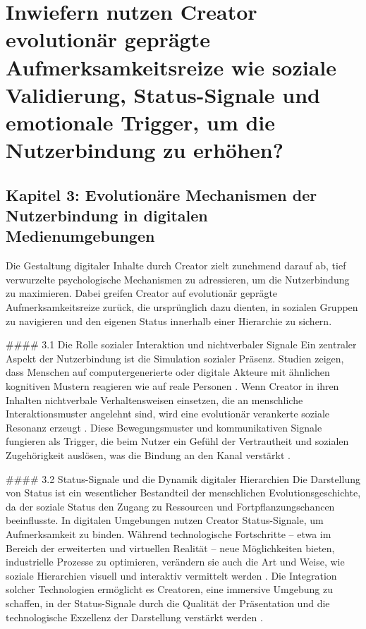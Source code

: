 \documentclass[11pt,a4paper]{article}
\begin{document}
\section{Inwiefern nutzen Creator evolutionär geprägte Aufmerksamkeitsreize wie soziale Validierung, Status-Signale und emotionale Trigger, um die Nutzerbindung zu erhöhen?}

\subsection{Kapitel 3: Evolutionäre Mechanismen der Nutzerbindung in digitalen Medienumgebungen}

Die Gestaltung digitaler Inhalte durch Creator zielt zunehmend darauf ab, tief verwurzelte psychologische Mechanismen zu adressieren, um die Nutzerbindung zu maximieren. Dabei greifen Creator auf evolutionär geprägte Aufmerksamkeitsreize zurück, die ursprünglich dazu dienten, in sozialen Gruppen zu navigieren und den eigenen Status innerhalb einer Hierarchie zu sichern.

\#\#\#\# 3.1 Die Rolle sozialer Interaktion und nichtverbaler Signale Ein zentraler Aspekt der Nutzerbindung ist die Simulation sozialer Präsenz. Studien zeigen, dass Menschen auf computergenerierte oder digitale Akteure mit ähnlichen kognitiven Mustern reagieren wie auf reale Personen \autocite{arxiv_2301_09025}. Wenn Creator in ihren Inhalten nichtverbale Verhaltensweisen einsetzen, die an menschliche Interaktionsmuster angelehnt sind, wird eine evolutionär verankerte soziale Resonanz erzeugt \autocite{arxiv_2301_09025}. Diese Bewegungsmuster und kommunikativen Signale fungieren als Trigger, die beim Nutzer ein Gefühl der Vertrautheit und sozialen Zugehörigkeit auslösen, was die Bindung an den Kanal verstärkt \autocite{arxiv_2301_09025}.

\#\#\#\# 3.2 Status-Signale und die Dynamik digitaler Hierarchien Die Darstellung von Status ist ein wesentlicher Bestandteil der menschlichen Evolutionsgeschichte, da der soziale Status den Zugang zu Ressourcen und Fortpflanzungschancen beeinflusste. In digitalen Umgebungen nutzen Creator Status-Signale, um Aufmerksamkeit zu binden. Während technologische Fortschritte – etwa im Bereich der erweiterten und virtuellen Realität – neue Möglichkeiten bieten, industrielle Prozesse zu optimieren, verändern sie auch die Art und Weise, wie soziale Hierarchien visuell und interaktiv vermittelt werden \autocite{arxiv_1709_01020}. Die Integration solcher Technologien ermöglicht es Creatoren, eine immersive Umgebung zu schaffen, in der Status-Signale durch die Qualität der Präsentation und die technologische Exzellenz der Darstellung verstärkt werden \autocite{arxiv_1709_01020}.
\end{document}
